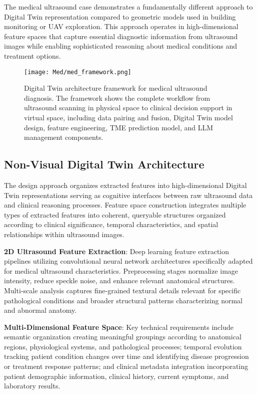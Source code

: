 The medical ultrasound case demonstrates a fundamentally different approach to Digital Twin representation compared to geometric models used in building monitoring or UAV exploration. This approach operates in high-dimensional feature spaces that capture essential diagnostic information from ultrasound images while enabling sophisticated reasoning about medical conditions and treatment options.

\begin{figure}[htbp]
\centering
\texttt{[image: Med/med\_framework.png]}
\caption{Digital Twin architecture framework for medical ultrasound diagnosis.
The framework shows the complete workflow from ultrasound scanning in physical
space to clinical decision support in virtual space, including data pairing and
fusion, Digital Twin model design, feature engineering, TME prediction model,
and LLM management components.}
\label{fig:med_framework}
\end{figure}

\subsection{Non-Visual Digital Twin Architecture}

The design approach organizes extracted features into high-dimensional Digital Twin representations serving as cognitive interfaces between raw ultrasound data and clinical reasoning processes. Feature space construction integrates multiple types of extracted features into coherent, queryable structures organized according to clinical significance, temporal characteristics, and spatial relationships within ultrasound images.

\textbf{2D Ultrasound Feature Extraction}: Deep learning feature extraction pipelines utilizing convolutional neural network architectures specifically adapted for medical ultrasound characteristics. Preprocessing stages normalize image intensity, reduce speckle noise, and enhance relevant anatomical structures. Multi-scale analysis captures fine-grained textural details relevant for specific pathological conditions and broader structural patterns characterizing normal and abnormal anatomy.

\textbf{Multi-Dimensional Feature Space}: Key technical requirements include semantic organization creating meaningful groupings according to anatomical regions, physiological systems, and pathological processes; temporal evolution tracking patient condition changes over time and identifying disease progression or treatment response patterns; and clinical metadata integration incorporating patient demographic information, clinical history, current symptoms, and laboratory results.

